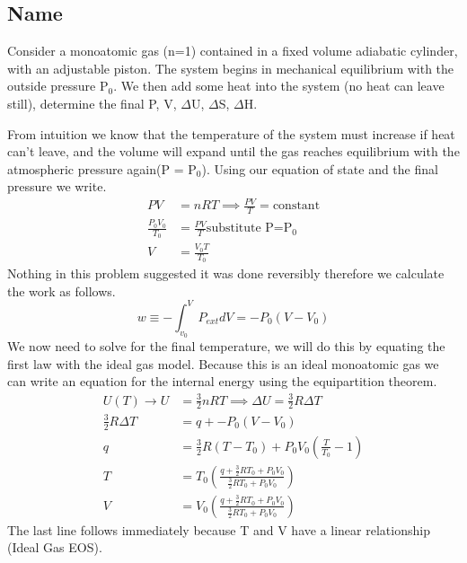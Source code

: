 \documentclass{article}
\begin{document}
\subsection*{Name}
Consider a monoatomic gas (n=1) contained in a fixed volume adiabatic cylinder, with an adjustable piston. 
The system begins in mechanical equilibrium with the outside pressure P$_0$. 
We then add some heat into the system (no heat can leave still), determine the final P, V, $\Delta$U, $\Delta$S, $\Delta$H.

From intuition we know that the temperature of the system must increase if heat can't leave, and the volume will expand until the gas reaches equilibrium with the atmospheric pressure again(P = P$_0$). 
Using our equation of state and the final pressure we write. 
\begin{equation}
    \begin{split}
        PV &= nRT \implies \frac{PV}{T} = \text{constant} \\
        \frac{P_0V_0}{T_0} &= \frac{PV}{T} \text{substitute P=P$_0$} \\
        V &= \frac{V_0T}{T_0}
    \end{split}
\end{equation}
Nothing in this problem suggested it was done reversibly therefore we calculate the work as follows.
\begin{equation}
        w \equiv -\int_{v_0}^V P_{ext}dV = -P_0(V-V_0)
\end{equation}
We now need to solve for the final temperature, we will do this by equating the first law with the ideal gas model.
Because this is an ideal monoatomic gas we can write an equation for the internal energy using the equipartition theorem. 
\begin{equation}
        \begin{split}
           U(T) \rightarrow U &= \frac{3}{2}nRT \implies \Delta U = \frac{3}{2}R\Delta T \\
           \frac{3}{2}R\Delta T &= q + -P_0(V-V_0)\\
           q &= \frac{3}{2}R(T-T_0) + P_0V_0\left(\frac{T}{T_0}-1\right) \\
           T &= T_0\left(  \frac{q+\frac{3}{2}RT_0+P_0V_0}{\frac{3}{2}RT_0+P_0V_0} \right)\\
           V &= V_0\left(  \frac{q+\frac{3}{2}RT_0+P_0V_0}{\frac{3}{2}RT_0+P_0V_0} \right)
        \end{split}
\end{equation}
The last line follows immediately because T and V have a linear relationship (Ideal Gas EOS).
\end{document}
